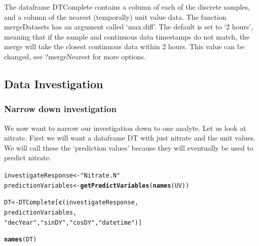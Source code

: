\documentclass[a4paper,11pt]{article}\usepackage[]{graphicx}\usepackage[]{color}
\makeatletter
\newcommand{\hlstr}[1]{\textcolor[rgb]{0.192,0.494,0.8}{#1}}%
\newcommand{\hlkwd}[1]{\textcolor[rgb]{0.737,0.353,0.396}{\textbf{#1}}}%
\newenvironment{kframe}{%
 \def\at@end@of@kframe{}%
 \ifinner\ifhmode%
  \def\at@end@of@kframe{\end{minipage}}%
  \begin{minipage}{\columnwidth}%
 \fi\fi%
 \def\FrameCommand##1{\hskip\@totalleftmargin \hskip-\fboxsep
 \colorbox{shadecolor}{##1}\hskip-\fboxsep
     \hskip-\linewidth \hskip-\@totalleftmargin \hskip\columnwidth}%
 \MakeFramed {\advance\hsize-\width
   \@totalleftmargin\z@ \linewidth\hsize
   \@setminipage}}%
 {\par\unskip\endMakeFramed%
 \at@end@of@kframe}
\newenvironment{knitrout}{}{} %
\makeatother
\begin{document}
The dataframe DTComplete contains a column of each of the discrete samples, and a column of the nearest (temporally) unit value data. The function mergeDatasets has an argument called `max.diff'. The default is set to `2 hours', meaning that if the sample and continuous data timestamps do not match, the merge will take the closest continuous data within 2 hours. This value can be changed, see ?mergeNearest for more options.

\subsection{Data Investigation}

\subsubsection{Narrow down investigation}


We now want to narrow our investigation down to one analyte. Let us look at nitrate. First we will want a dataframe DT with just nitrate and the unit values. We will call these the `prediction values' because they will eventually be used to predict nitrate.

\begin{knitrout}
\color{fgcolor}\begin{kframe}
\begin{alltt}
investigateResponse <- \hlstr{"Nitrate.N"}
predictionVariables <- \hlkwd{getPredictVariables}(\hlkwd{names}(UV))

DT <- DTComplete[\hlkwd{c}(investigateResponse,
                   predictionVariables, 
                   \hlstr{"decYear"},\hlstr{"sinDY"},\hlstr{"cosDY"},\hlstr{"datetime"})]
\end{alltt}


{\ttfamily\noindent\bfseries\color{errorcolor}{Error: object 'DTComplete' not found}}\begin{alltt}

\hlkwd{names}(DT)
\end{alltt}


{\ttfamily\noindent\bfseries\color{errorcolor}{Error: object 'DT' not found}}\end{kframe}
\end{knitrout}
\end{document}
